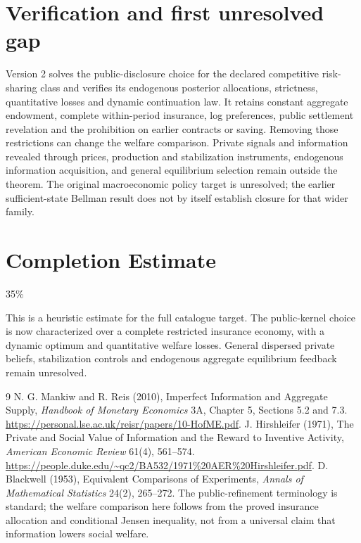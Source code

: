 \documentclass[11pt]{article}
\theoremstyle{remark}
\begin{document}
\section{Verification and first unresolved gap}
Version 2 solves the public-disclosure choice for the declared competitive
risk-sharing class and verifies its endogenous posterior allocations,
strictness, quantitative losses and dynamic continuation law. It retains
constant aggregate endowment, complete within-period insurance, log
preferences, public settlement revelation and the prohibition on earlier
contracts or saving. Removing those restrictions can change the welfare
comparison. Private signals and information revealed through prices,
production and stabilization instruments, endogenous information acquisition,
and general equilibrium selection remain outside the theorem. The original
macroeconomic policy target is unresolved; the earlier sufficient-state
Bellman result does not by itself establish closure for that wider family.

\section{Completion Estimate}
35\%

This is a heuristic estimate for the full catalogue target. The public-kernel
choice is now characterized over a complete restricted insurance economy,
with a dynamic optimum and quantitative welfare losses. General dispersed
private beliefs, stabilization controls and endogenous aggregate equilibrium
feedback remain unresolved.

\begin{thebibliography}{9}
 N. G. Mankiw and R. Reis (2010), Imperfect Information and
Aggregate Supply, \emph{Handbook of Monetary Economics} 3A, Chapter 5,
Sections 5.2 and 7.3. \url{https://personal.lse.ac.uk/reisr/papers/10-HofME.pdf}.
 J. Hirshleifer (1971), The Private and Social Value
of Information and the Reward to Inventive Activity,
\emph{American Economic Review} 61(4), 561--574.
\url{https://people.duke.edu/~qc2/BA532/1971%20AER%20Hirshleifer.pdf}.
 D. Blackwell (1953), Equivalent Comparisons of Experiments,
\emph{Annals of Mathematical Statistics} 24(2), 265--272.
The public-refinement terminology is standard; the welfare comparison here
follows from the proved insurance allocation and conditional Jensen inequality,
not from a universal claim that information lowers social welfare.
\end{thebibliography}
\end{document}
